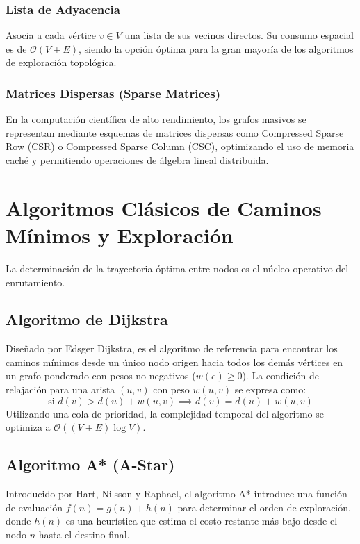 \documentclass[11pt,letterpaper]{article}
\begin{document}
\subsubsection{Lista de Adyacencia}
Asocia a cada vértice $v \in V$ una lista de sus vecinos directos. Su consumo espacial es de $\mathcal{O}(V + E)$, siendo la opción óptima para la gran mayoría de los algoritmos de exploración topológica.

\subsubsection{Matrices Dispersas (Sparse Matrices)}
En la computación científica de alto rendimiento, los grafos masivos se representan mediante esquemas de matrices dispersas como Compressed Sparse Row (CSR) o Compressed Sparse Column (CSC), optimizando el uso de memoria caché y permitiendo operaciones de álgebra lineal distribuida.

\section{Algoritmos Clásicos de Caminos Mínimos y Exploración}
La determinación de la trayectoria óptima entre nodos es el núcleo operativo del enrutamiento. 

\subsection{Algoritmo de Dijkstra}
Diseñado por Edsger Dijkstra, es el algoritmo de referencia para encontrar los caminos mínimos desde un único nodo origen hacia todos los demás vértices en un grafo ponderado con pesos no negativos ($w(e) \ge 0$). La condición de relajación para una arista $(u, v)$ con peso $w(u,v)$ se expresa como:
\begin{equation}
\text{si } d(v) > d(u) + w(u, v) \implies d(v) = d(u) + w(u, v)
\end{equation}
Utilizando una cola de prioridad, la complejidad temporal del algoritmo se optimiza a $\mathcal{O}((V + E) \log V)$.

\subsection{Algoritmo A* (A-Star)}
Introducido por Hart, Nilsson y Raphael, el algoritmo A* introduce una función de evaluación $f(n) = g(n) + h(n)$ para determinar el orden de exploración, donde $h(n)$ es una heurística que estima el costo restante más bajo desde el nodo $n$ hasta el destino final.
\end{document}
